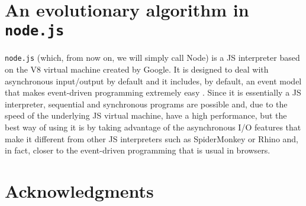 \documentclass{sig-alternate}
\begin{document}
\section{An evolutionary algorithm in {\tt node.js}}
\label{sec:node}

{\tt node.js} (which, from now on, we will simply call Node) is a JS
interpreter based on the V8 virtual machine created by Google. It is
designed to deal with asynchronous input/output by default and it
includes, by default, an event model that makes event-driven
programming extremely easy \cite{5617064}. Since it is essentially a
JS interpreter, sequential and synchronous programs are possible and,
due to the speed of the underlying JS virtual machine, have a high
performance, but the best way of using it is by taking advantage of
the asynchronous I/O features that make it different from other JS
interpreters such as SpiderMonkey or Rhino and, in fact, closer to the
event-driven programming that is usual in browsers.



\section{Acknowledgments}


%

\end{document}
